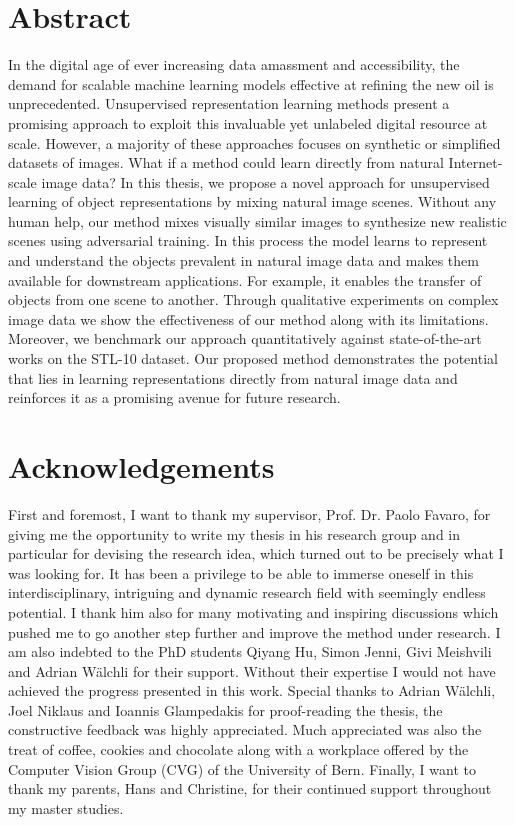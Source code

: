 \documentclass[a4paper,12pt]{report}
\begin{document}
\chapter*{Abstract}
In the digital age of ever increasing data amassment and accessibility, the demand for scalable machine learning models effective at refining the new oil is unprecedented. Unsupervised representation learning methods present a promising approach to exploit this invaluable yet unlabeled digital resource at scale. However, a majority of these approaches focuses on synthetic or simplified datasets of images. What if a method could learn directly from natural Internet-scale image data? In this thesis, we propose a novel approach for unsupervised learning of object representations by mixing natural image scenes. Without any human help, our method mixes visually similar images to synthesize new realistic scenes using adversarial training. In this process the model learns to represent and understand the objects prevalent in natural image data and makes them available for downstream applications. For example, it enables the transfer of objects from one scene to another. Through qualitative experiments on complex image data we show the effectiveness of our method along with its limitations. Moreover, we benchmark our approach quantitatively against state-of-the-art works on the STL-10 dataset. Our proposed method demonstrates the potential that lies in learning representations directly from natural image data and reinforces it as a promising avenue for future research.


\newpage
\chapter*{Acknowledgements}
First and foremost, I want to thank my supervisor, Prof. Dr. Paolo Favaro, for giving me the opportunity to write my thesis in his research group and in particular for devising the research idea, which turned out to be precisely what I was looking for. It has been a privilege to be able to immerse oneself in this interdisciplinary, intriguing and dynamic research field with seemingly endless potential. I thank him also for many motivating and inspiring discussions which pushed me to go another step further and improve the method under research. I am also indebted to the PhD students Qiyang Hu, Simon Jenni, Givi Meishvili and Adrian Wälchli for their support. Without their expertise I would not have achieved the progress presented in this work. Special thanks to Adrian Wälchli, Joel Niklaus and Ioannis Glampedakis for proof-reading the thesis, the constructive feedback was highly appreciated. Much appreciated was also the treat of coffee, cookies and chocolate along with a workplace offered by the Computer Vision Group (CVG) of the University of Bern. Finally, I want to thank my parents, Hans and Christine, for their continued support throughout my master studies.
\end{document}
